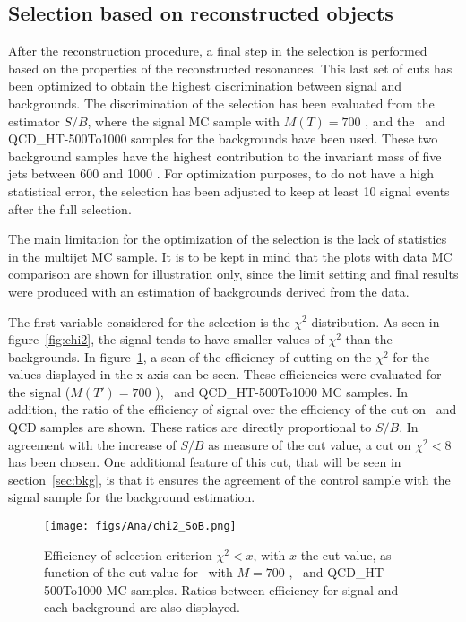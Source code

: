 \subsection{Selection based on reconstructed objects}
\label{sec:finalsel}

After the reconstruction procedure, a final step in the selection is performed based on the properties of the reconstructed resonances. This last set of cuts has been optimized to obtain the highest discrimination between signal and backgrounds. The discrimination of the selection has been evaluated from the estimator $S/B$, where the signal MC sample with $M(T)=700$ \GeVcc, and the \ttbar~and QCD\_HT-500To1000 samples for the backgrounds have been used. These two background samples have the highest contribution to the invariant mass of five jets between 600 and 1000 \GeVcc. For optimization purposes, to do not have a high statistical error, the selection has been adjusted to keep at least 10 signal events after the full selection.

The main limitation for the optimization of the selection is the lack of statistics in the multijet MC sample. It is to be kept in mind that the plots with data MC comparison are shown for illustration only, since the limit setting and final results were produced with an estimation of backgrounds derived from the data.

The first variable considered for the selection is the $\chi^{2}$ distribution. As seen in figure~\ref{fig:chi2}, the signal tends to have smaller values of $\chi^{2}$ than the backgrounds. In figure~\ref{fig:chi2cut}, a scan of the efficiency of cutting on the $\chi^{2}$ for the values displayed in the x-axis can be seen. These efficiencies were evaluated for the signal ($M(T')=700$ \GeVcc), \ttbar~and QCD\_HT-500To1000 MC samples. In addition, the ratio of the efficiency of signal over the efficiency of the cut on \ttbar~and QCD samples are shown. These ratios are directly proportional to $S/B$. In agreement with the increase of $S/B$ as measure of the cut value, a cut on $\chi^{2}<8$ has been chosen. One additional feature of this cut, that will be seen in section~\ref{sec:bkg}, is that it ensures the agreement of the control sample with the signal sample for the background estimation. 

\begin{figure}[!Hhtbp]
  \begin{center}
    \texttt{[image: figs/Ana/chi2\_SoB.png]}
    \caption{Efficiency of selection criterion $\chi^{2}<x$, with $x$ the cut value, as function of the cut value for \Tp~with $M=700$ \GeVcc, \ttbar~and QCD\_HT-500To1000 MC samples. Ratios between efficiency for signal and each background are also displayed.}
    \label{fig:chi2cut}
  \end{center}
\end{figure}

